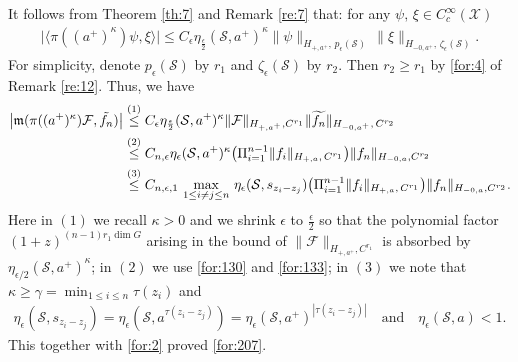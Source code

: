 \documentclass[11 pt]{amsart}
\newcommand{\norm}[1]{\lVert#1\rVert}
\theoremstyle{definition}
\numberwithin{equation}{section}
\begin{document}
It follows from Theorem \ref{th:7} and Remark \ref{re:7} that: for any $\psi,\,\xi\in C^\infty_c(\mathcal{X})$
\begin{align*}
 \big|\langle \pi((a^+)^\kappa)\psi, \xi\rangle\big|\leq C_\epsilon \eta_{\frac{\epsilon}{2}}(\mathcal{S}, a^+)^{\kappa}\norm{\psi}_{H_{+,a^+},\,p_{\epsilon}(\mathcal{S})}\,\big\|\xi\big\|_{H_{-0,a^+},\,\zeta_{\epsilon}(\mathcal{S})}.
\end{align*}
For simplicity, denote $p_{\epsilon}(\mathcal{S})$ by $r_1$ and $\zeta_{\epsilon}(\mathcal{S})$ by $r_2$. Then $r_2\geq r_1$ by \eqref{for:4} of Remark \ref{re:12}. Thus, we have
\begin{align*}
 \big|\mathfrak{m}(\pi((a^+)^\kappa)\mathcal{F}, \tilde{f_{n}})\big|&\overset{\text{(1)}}{\leq} C_\epsilon \eta_{\frac{\epsilon}{2}}(\mathcal{S}, a^+)^{\kappa} \norm{\mathcal{F}}_{H_{+,a^+}, C^{r_{1}}}\norm{\widetilde{f_{n}}}_{H_{-0,a^+},\,C^{r_{2}}}\notag\\
&\overset{\text{(2)}}{\leq}C_{n,\epsilon}\eta_{\epsilon}(\mathcal{S}, a^+)^{\kappa}\big(\Pi_{i=1}^{n-1}\norm{f_i}_{H_{+,a},\, C^{r_{1}}}\big)\norm{f_n}_{H_{-0,a}, C^{r_{2}}}\\
&\overset{\text{(3)}}{\leq}   C_{n,\epsilon,1}\,\max_{1\le i\neq j\le n} \,\eta_{\epsilon}(\mathcal{S}, s_{z_i-z_j}) \big(\Pi_{i=1}^{n-1}\norm{f_i}_{H_{+,a},\, C^{r_{1}}}\big)\norm{f_n}_{H_{-0,a}, C^{r_{2}}}.
\end{align*}
Here in $(1)$ we recall $\kappa>0$ and we shrink $\epsilon$ to $\frac{\epsilon}{2}$ so that  the polynomial factor $(1+z)^{(n-1)r_1\dim G}$ arising in the bound of
\(\|\mathcal{F}\|_{H_{+,a^+}, C^{r_{1}}}\) is absorbed by
$\eta_{\epsilon/2}(\mathcal S,a^+)^\kappa$; in $(2)$ we use \eqref{for:130} and \eqref{for:133}; in $(3)$ we note that $\kappa\ge\gamma=\min_{1\le i\le n} \tau(z_i)$ and
\begin{align*}
\eta_{\epsilon}(\mathcal{S}, s_{z_i-z_j})=\eta_{\epsilon}(\mathcal{S}, a^{\tau(z_i-z_j)})=\eta_{\epsilon}(\mathcal{S}, a^+)^{|\tau(z_i-z_j)|}\quad \text{and}\quad
\eta_{\epsilon}(\mathcal{S}, a)<1.
\end{align*}
This together with \eqref{for:2} proved \eqref{for:207}.
\end{document}
